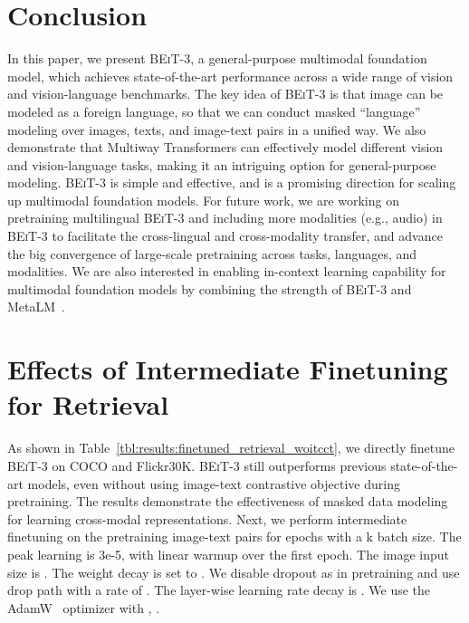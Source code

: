 \documentclass{article}
\newcommand\our{\textsc{BEiT-3}}
\newcommand\multiway{Multiway Transformers}
\begin{document}
\section{Conclusion}

In this paper, we present \our{}, a general-purpose multimodal foundation model, which achieves state-of-the-art performance across a wide range of vision and vision-language benchmarks.
The key idea of \our{} is that image can be modeled as a foreign language, so that we can conduct masked ``language'' modeling over images, texts, and image-text pairs in a unified way.
We also demonstrate that \multiway{} can effectively model different vision and vision-language tasks, making it an intriguing option for general-purpose modeling.
\our{} is simple and effective, and is a promising direction for scaling up multimodal foundation models.
For future work, we are working on pretraining multilingual \our{} and including more modalities (e.g., audio) in \our{} to facilitate the cross-lingual and cross-modality transfer, and advance the big convergence of large-scale pretraining across tasks, languages, and modalities.
We are also interested in enabling in-context learning capability for multimodal foundation models by combining the strength of \our{} and MetaLM~\cite{metalm}.

\newpage





\newpage
\appendix


\section{Effects of Intermediate Finetuning for Retrieval}

As shown in Table~\ref{tbl:results:finetuned_retrieval_woitcct}, we directly finetune \our{} on COCO and Flickr30K.
\our{} still outperforms previous state-of-the-art models, even without using image-text contrastive objective during pretraining.
The results demonstrate the effectiveness of masked data modeling for learning cross-modal representations.
Next, we perform intermediate finetuning on the pretraining image-text pairs for  epochs with a k batch size.
The peak learning is 3e-5, with linear warmup over the first epoch.
The image input size is .
The weight decay is set to .
We disable dropout as in pretraining and use drop path with a rate of .
The layer-wise learning rate decay is .
We use the AdamW~\citep{adamw} optimizer with , .
\end{document}
